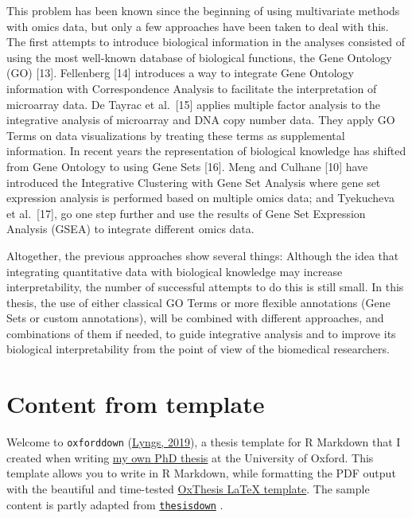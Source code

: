 \documentclass[a4paper, nobind]{templates/ociamthesis}
\begin{document}
This problem has been known since the beginning of using multivariate methods with omics data, but only a few approaches have been taken to deal with this. The first attempts to introduce biological information in the analyses consisted of using the most well-known database of biological functions, the Gene Ontology (GO) {[}13{]}. Fellenberg {[}14{]} introduces a way to integrate Gene Ontology information with Correspondence Analysis to facilitate the interpretation of microarray data. De Tayrac et al.~{[}15{]} applies multiple factor analysis to the integrative analysis of microarray and DNA copy number data. They apply GO Terms on data visualizations by treating these terms as supplemental information. In recent years the representation of biological knowledge has shifted from Gene Ontology to using Gene Sets {[}16{]}. Meng and Culhane {[}10{]} have introduced the Integrative Clustering with Gene Set Analysis where gene set expression analysis is performed based on multiple omics data; and Tyekucheva et al.~{[}17{]}, go one step further and use the results of Gene Set Expression Analysis (GSEA) to integrate different omics data.

Altogether, the previous approaches show several things: Although the idea that integrating quantitative data with biological knowledge may increase interpretability, the number of successful attempts to do this is still small. In this thesis, the use of either classical GO Terms or more flexible annotations (Gene Sets or custom annotations), will be combined with different approaches, and combinations of them if needed, to guide integrative analysis and to improve its biological interpretability from the point of view of the biomedical researchers.

\hypertarget{content-from-template}{%
\section{Content from template}\label{content-from-template}}

Welcome to \texttt{oxforddown} (\protect\hyperlink{ref-lyngsOxforddown2019}{Lyngs, 2019}), a thesis template for R Markdown that I created when writing \href{https://ulyngs.github.io/phd-thesis/}{my own PhD thesis} at the University of Oxford.
This template allows you to write in R Markdown, while formatting the PDF output with the beautiful and time-tested \href{https://github.com/mcmanigle/OxThesis}{OxThesis LaTeX template}.
The sample content is partly adapted from \href{https://github.com/ismayc/thesisdown}{\texttt{thesisdown}} .
\end{document}
